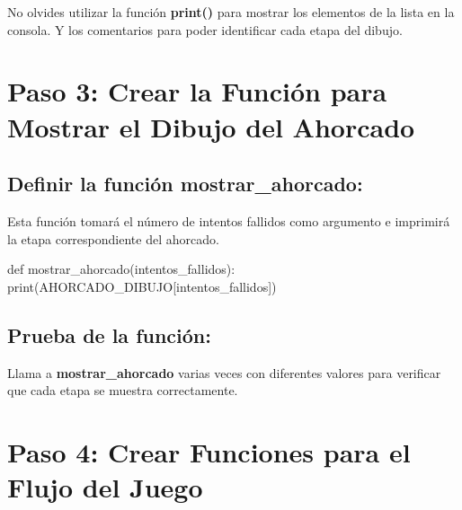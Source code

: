 \documentclass[
  a4paper,
  DIV=11,
  numbers=noendperiod,
  onepage,
  openany]{scrreprt}
\newenvironment{Shaded}{\begin{snugshade}}{\end{snugshade}}
\newcommand{\BuiltInTok}[1]{\textcolor[rgb]{0.00,0.23,0.31}{#1}}
\newcommand{\KeywordTok}[1]{\textcolor[rgb]{0.00,0.23,0.31}{#1}}
\newcommand{\NormalTok}[1]{\textcolor[rgb]{0.00,0.23,0.31}{#1}}
\begin{document}
\begin{tcolorbox}[enhanced jigsaw, bottomrule=.15mm, rightrule=.15mm, colframe=quarto-callout-tip-color-frame, arc=.35mm, breakable, colbacktitle=quarto-callout-tip-color!10!white, toptitle=1mm, colback=white, opacitybacktitle=0.6, opacityback=0, bottomtitle=1mm, toprule=.15mm, titlerule=0mm, left=2mm, coltitle=black, leftrule=.75mm, title=\textcolor{quarto-callout-tip-color}{\faLightbulb}\hspace{0.5em}{Tip}]

No olvides utilizar la función \textbf{print()} para mostrar los
elementos de la lista en la consola. Y los comentarios para poder
identificar cada etapa del dibujo.

\end{tcolorbox}

\section{Paso 3: Crear la Función para Mostrar el Dibujo del
Ahorcado}\label{paso-3-crear-la-funciuxf3n-para-mostrar-el-dibujo-del-ahorcado}

\subsection{Definir la función
mostrar\_ahorcado:}\label{definir-la-funciuxf3n-mostrar_ahorcado}

Esta función tomará el número de intentos fallidos como argumento e
imprimirá la etapa correspondiente del ahorcado.

\begin{Shaded}
\begin{Highlighting}[]
\KeywordTok{def}\NormalTok{ mostrar\_ahorcado(intentos\_fallidos):}
    \BuiltInTok{print}\NormalTok{(AHORCADO\_DIBUJO[intentos\_fallidos])}
\end{Highlighting}
\end{Shaded}

\subsection{Prueba de la función:}\label{prueba-de-la-funciuxf3n}

Llama a \textbf{mostrar\_ahorcado} varias veces con diferentes valores
para verificar que cada etapa se muestra correctamente.

\section{Paso 4: Crear Funciones para el Flujo del
Juego}\label{paso-4-crear-funciones-para-el-flujo-del-juego}
\end{document}
